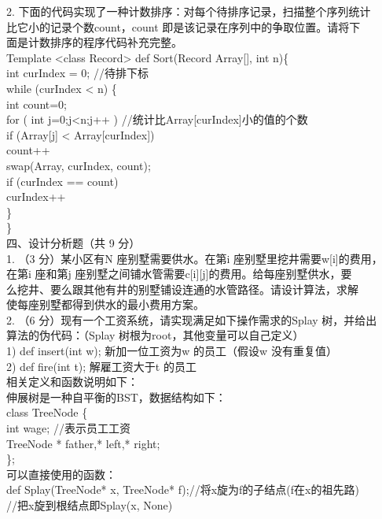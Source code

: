 \begin{question}
2. 下面的代码实现了一种计数排序：对每个待排序记录，扫描整个序列统计\\
比它小的记录个数count，count 即是该记录在序列中的争取位置。请将下\\
面是计数排序的程序代码补充完整。\\
Template <class Record> def Sort(Record Array[], int n)\{\\
int curIndex = 0;        //待排下标\\
while (curIndex < n) \{\\
int count=0;\\
for ( int j=0;j<n;j++ )  //统计比Array[curIndex]小的值的个数\\
if (Array[j] < Array[curIndex])\\
count++\\
swap(Array, curIndex, count);\\
if (curIndex == count)\\
curIndex++\\
\}\\
\}\\
四、设计分析题（共 9 分）\\
1. （3 分）某小区有N 座别墅需要供水。在第i 座别墅里挖井需要w[i]的费用，\\
在第i 座和第j 座别墅之间铺水管需要c[i][j]的费用。给每座别墅供水，要\\
么挖井、要么跟其他有井的别墅铺设连通的水管路径。请设计算法，求解\\
使每座别墅都得到供水的最小费用方案。\\
2. （6 分）现有一个工资系统，请实现满足如下操作需求的Splay 树，并给出\\
算法的伪代码：（Splay 树根为root，其他变量可以自己定义）\\
1) def insert(int w);  新加一位工资为w 的员工（假设w 没有重复值）\\
2) def fire(int t);     解雇工资大于t 的员工\\
相关定义和函数说明如下：\\
伸展树是一种自平衡的BST，数据结构如下：\\
class TreeNode \{\\
int   wage;           //表示员工工资\\
TreeNode * father,* left,* right;\\
\};\\
可以直接使用的函数：\\
def Splay(TreeNode* x, TreeNode* f);//将x旋为f的子结点(f在x的祖先路)\\
//把x旋到根结点即Splay(x, None)\\

\end{question}
